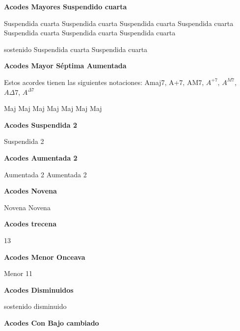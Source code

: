 \vskip 20pt
\textbf{Acodes Mayores Suspendido cuarta}
\vskip 25pt

\small
{} Suspendida cuarta
 Suspendida cuarta
 Suspendida cuarta
 Suspendida cuarta
 Suspendida cuarta
 Suspendida cuarta
 Suspendida cuarta

 sostenido Suspendida cuarta
 Suspendida cuarta
\normalsize

\vskip 20pt
\textbf{Acodes Mayor S\'eptima Aumentada}
\vskip 25pt

Estos acordes tienen las siguientes notaciones:
Amaj7, A+7, AM7, $A^{+7}$, $A^{M7}$, $A\Delta7$, $A^{\Delta7}$\break
\vskip 20pt

\small
{} Maj
 Maj
 Maj
 Maj
 Maj
 Maj
 Maj
\normalsize

\vskip 20pt
\textbf{Acodes Suspendida 2}
\vskip 25pt

\small
{} Suspendida 2
\normalsize

\vskip 20pt
\textbf{Acodes Aumentada 2}
\vskip 25pt

\small
{} Aumentada 2
 Aumentada 2
\normalsize

\vskip 20pt
\textbf{Acodes Novena}
\vskip 25pt

\small
{} Novena
 Novena
\normalsize

\vskip 20pt
\textbf{Acodes trecena}
\vskip 25pt

\small
{} 13
\normalsize

\vskip 20pt
\textbf{Acodes Menor Onceava}
\vskip 25pt

\small
{} Menor 11
\normalsize

\vskip 20pt
\textbf{Acodes Disminuidos}
\vskip 25pt

\small
{} sostenido disminuido
\normalsize


\vskip 20pt
\textbf{Acodes Con Bajo cambiado}

